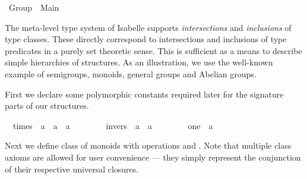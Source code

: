%
\begin{isabellebody}%
\def\isabellecontext{Group}%
\isamarkupfalse%
%
\isamarkuptrue%
%
\isadelimtheory
%
\endisadelimtheory
%
\isatagtheory
{}\isamarkupfalse%
\ Group\ \ Main\ %
\endisatagtheory
{\isafoldtheory}%
%
\isadelimtheory
%
\endisadelimtheory
%
\begin{isamarkuptext}%
\medskip\noindent The meta-level type system of Isabelle supports
  \emph{intersections} and \emph{inclusions} of type classes. These
  directly correspond to intersections and inclusions of type
  predicates in a purely set theoretic sense. This is sufficient as a
  means to describe simple hierarchies of structures.  As an
  illustration, we use the well-known example of semigroups, monoids,
  general groups and Abelian groups.%
\end{isamarkuptext}%
\isamarkuptrue%
%
\isamarkuptrue%
%
\begin{isamarkuptext}%
First we declare some polymorphic constants required later for the
  signature parts of our structures.%
\end{isamarkuptext}%
\isamarkuptrue%
\isamarkupfalse%
\isanewline
\ \ times\ {\isacharcolon}{\isacharcolon}\ {\isachardoublequoteopen}{\isacharprime}a\ {\isasymRightarrow}\ {\isacharprime}a\ {\isasymRightarrow}\ {\isacharprime}a{\isachardoublequoteclose}\ \ \ \ {\isacharparenleft}\ {\isachardoublequoteopen}{\isasymodot}{\isachardoublequoteclose}\ {}{}{\isacharparenright}\isanewline
\ \ invers\ {\isacharcolon}{\isacharcolon}\ {\isachardoublequoteopen}{\isacharprime}a\ {\isasymRightarrow}\ {\isacharprime}a{\isachardoublequoteclose}\ \ \ \ {\isacharparenleft}{\isachardoublequoteopen}{\isacharparenleft}{\isacharunderscore}{\isasyminv}{\isacharparenright}{\isachardoublequoteclose}\ {\isacharbrackleft}{}{}{}{}{\isacharbrackright}\ {}{}{}{\isacharparenright}\isanewline
\ \ one\ {\isacharcolon}{\isacharcolon}\ {\isacharprime}a\ \ \ \ {\isacharparenleft}{\isachardoublequoteopen}{\isasymone}{\isachardoublequoteclose}{\isacharparenright}%
\begin{isamarkuptext}%
\noindent Next we define class  of monoids with
  operations \isa{{\isasymodot}} and \isa{{\isasymone}}.  Note that multiple class
  axioms are allowed for user convenience --- they simply represent
  the conjunction of their respective universal closures.%

\end{isamarkuptext}
\end{isabellebody}
